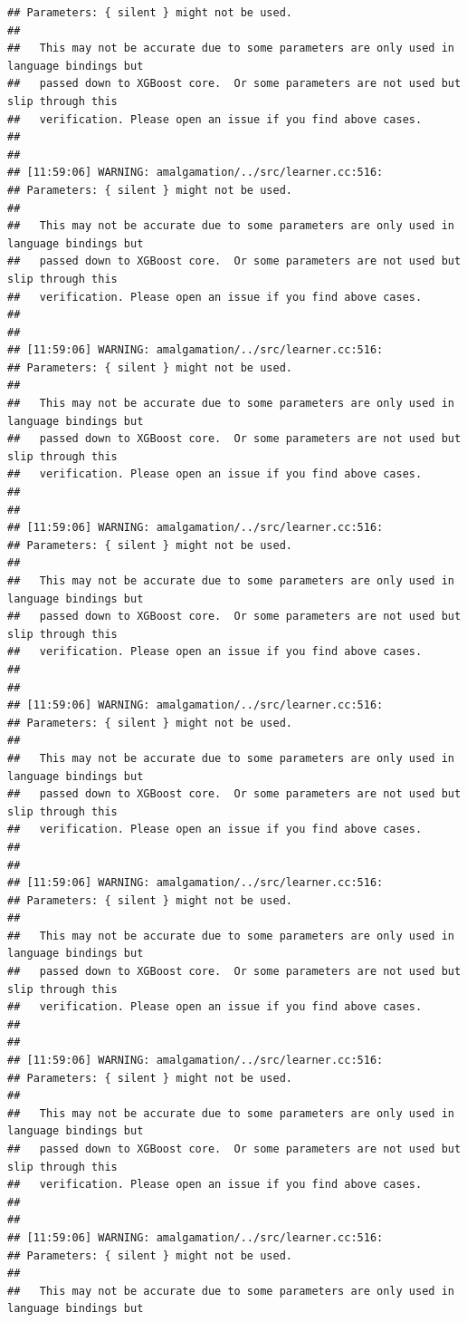 \documentclass[AMS,STIX2COL]{WileyNJD-v2}\usepackage[]{graphicx}\usepackage[]{color}
\makeatletter
\newenvironment{kframe}{%
 \def\at@end@of@kframe{}%
 \ifinner\ifhmode%
  \def\at@end@of@kframe{\end{minipage}}%
  \begin{minipage}{\columnwidth}%
 \fi\fi%
 \def\FrameCommand##1{\hskip\@totalleftmargin \hskip-\fboxsep
 \colorbox{shadecolor}{##1}\hskip-\fboxsep
     \hskip-\linewidth \hskip-\@totalleftmargin \hskip\columnwidth}%
 \MakeFramed {\advance\hsize-\width
   \@totalleftmargin\z@ \linewidth\hsize
   \@setminipage}}%
 {\par\unskip\endMakeFramed%
 \at@end@of@kframe}
\newenvironment{knitrout}{}{} %
\makeatother
\begin{document}
\begin{knitrout}
\begin{kframe}
\begin{verbatim}
## Parameters: { silent } might not be used.
## 
##   This may not be accurate due to some parameters are only used in language bindings but
##   passed down to XGBoost core.  Or some parameters are not used but slip through this
##   verification. Please open an issue if you find above cases.
## 
## 
## [11:59:06] WARNING: amalgamation/../src/learner.cc:516: 
## Parameters: { silent } might not be used.
## 
##   This may not be accurate due to some parameters are only used in language bindings but
##   passed down to XGBoost core.  Or some parameters are not used but slip through this
##   verification. Please open an issue if you find above cases.
## 
## 
## [11:59:06] WARNING: amalgamation/../src/learner.cc:516: 
## Parameters: { silent } might not be used.
## 
##   This may not be accurate due to some parameters are only used in language bindings but
##   passed down to XGBoost core.  Or some parameters are not used but slip through this
##   verification. Please open an issue if you find above cases.
## 
## 
## [11:59:06] WARNING: amalgamation/../src/learner.cc:516: 
## Parameters: { silent } might not be used.
## 
##   This may not be accurate due to some parameters are only used in language bindings but
##   passed down to XGBoost core.  Or some parameters are not used but slip through this
##   verification. Please open an issue if you find above cases.
## 
## 
## [11:59:06] WARNING: amalgamation/../src/learner.cc:516: 
## Parameters: { silent } might not be used.
## 
##   This may not be accurate due to some parameters are only used in language bindings but
##   passed down to XGBoost core.  Or some parameters are not used but slip through this
##   verification. Please open an issue if you find above cases.
## 
## 
## [11:59:06] WARNING: amalgamation/../src/learner.cc:516: 
## Parameters: { silent } might not be used.
## 
##   This may not be accurate due to some parameters are only used in language bindings but
##   passed down to XGBoost core.  Or some parameters are not used but slip through this
##   verification. Please open an issue if you find above cases.
## 
## 
## [11:59:06] WARNING: amalgamation/../src/learner.cc:516: 
## Parameters: { silent } might not be used.
## 
##   This may not be accurate due to some parameters are only used in language bindings but
##   passed down to XGBoost core.  Or some parameters are not used but slip through this
##   verification. Please open an issue if you find above cases.
## 
## 
## [11:59:06] WARNING: amalgamation/../src/learner.cc:516: 
## Parameters: { silent } might not be used.
## 
##   This may not be accurate due to some parameters are only used in language bindings but

\end{verbatim}
\end{kframe}
\end{knitrout}
\end{document}
